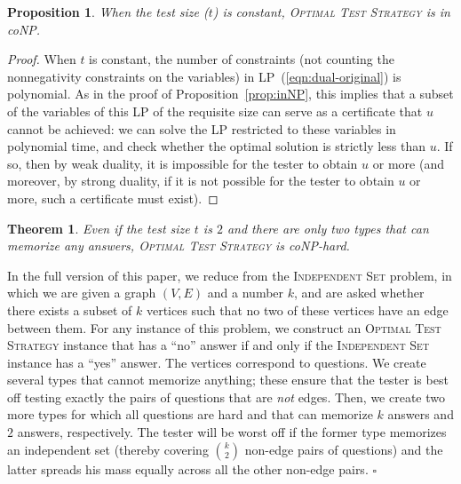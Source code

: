 \documentclass{article}
\newtheorem{theorem}{Theorem}
\newtheorem{proposition}{Proposition}
\def\QuadSpace{\vspace{0.25\baselineskip}}
\def\FullSpace{\vspace{1.0\baselineskip}}
\def\EndProof{ \hfill $\square$ 
\newline }
\newenvironment{sketch}{\QuadSpace\par\noindent{\em Sketch of
Proof.}}{\EndProof\FullSpace \vspace{-0.15in}}
\begin{document}
\begin{proposition}
  When the test size ($t$) is constant, \textsc{Optimal
    Test Strategy} is in coNP.
\end{proposition}
\begin{proof}
  When $t$ is constant, the number of constraints (not counting the
  nonnegativity constraints on the variables) in
  LP~(\ref{eqn:dual-original}) is polynomial.  As in the proof of
  Proposition~\ref{prop:inNP}, this implies that a subset of the variables
  of this LP of the requisite size can serve as a certificate that $u$
  cannot be achieved:  we can
  solve the LP restricted to these variables in polynomial time, and check
  whether the optimal solution is strictly less than $u$.  If so, then by
  weak duality, it is impossible for the tester to obtain $u$ or more (and
  moreover, by strong duality, if it is not possible for the tester to
  obtain $u$ or more, such a certificate must exist).
\end{proof}


\begin{theorem}\label{thm:memorize-hardness}
Even if the test size $t$ is $2$ and there are only two types that can
memorize any answers, \textsc{Optimal Test Strategy} is
coNP-hard.
\end{theorem}

\begin{sketch}
  In the full version of this paper, we reduce from the \textsc{Independent
    Set} problem, in which we are given a graph $(V,E)$ and a number $k$,
  and are asked whether there exists a subset of $k$ vertices such that no
  two of these vertices have an edge between them.  For any instance of
  this problem, we construct an \textsc{Optimal Test Strategy} instance
  that has a ``no'' answer if and only if the \textsc{Independent Set}
  instance has a ``yes'' answer.  The vertices correspond to questions.  We
  create several types that cannot memorize anything; these ensure that the
  tester is best off testing exactly the pairs of questions that are {\em
    not} edges.  Then, we create two more types for which all questions are
  hard and that can memorize $k$ answers and $2$ answers, respectively.
  The tester will be worst off if the former type memorizes an independent
  set (thereby covering $k \choose 2$ non-edge pairs of questions) and the
  latter spreads his mass equally across all the other non-edge pairs.
\end{sketch} 
\end{document}
